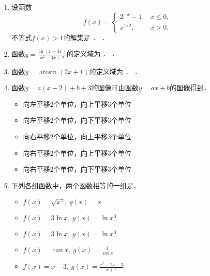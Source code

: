 \begin{enumerate}
\item 设函数
  \[
    f(x) =
    \begin{cases}
      2^{-x} - 1, & x \le 0, \\
      x^{1/2}, & x > 0.
    \end{cases}
  \]
  不等式\(f(x) > 1\)的解集是
  \ifshowsol
    \uline{}．
  \else
    \uline{\makebox[10em]{}}．
  \fi

\item 函数\(\displaystyle y = \frac{\ln(1+3x)}{x^2-3x+2}\)的定义域为
  \ifshowsol
    \uline{}．
  \else
    \uline{\makebox[13em]{}}．
  \fi

\item 函数\(y = \arcsin(2x+1)\)的定义域为
  \ifshowsol
    \uline{}．
  \else
    \uline{\makebox[5em]{}}．
  \fi

\item 函数\(y = a(x-2) + b + 3\)的图像可由函数\(y = ax + b\)的图像\uline{\makebox[4em]{}}得到．
  \begin{itemize}
    \renewcommand{\labelitemi}{\faCircleThin}
  \item 向左平移\(2\)个单位，向上平移\(3\)个单位
  \item 向左平移\(2\)个单位，向下平移\(3\)个单位
    \ifshowsol
    \item[\faCircle] 向右平移\(2\)个单位，向上平移\(3\)个单位
    \else
    \item 向右平移\(2\)个单位，向上平移\(3\)个单位
    \fi
  \item 向右平移\(2\)个单位，向下平移\(3\)个单位
  \end{itemize}

\item 下列各组函数中，两个函数相等的一组是\uline{\makebox[4em]{}}．
  \begin{itemize}
    \renewcommand{\labelitemi}{\faCircleThin}
  \item \(f(x) = \sqrt{x^2},\ g(x) = x\)
    \ifshowsol
    \item[\faCircle] \(f(x) = 3\ln x,\ g(x) = \ln x^3\)
    \else
    \item \(f(x) = 3\ln x,\ g(x) = \ln x^3\)
    \fi
  \item \(f(x) = \tan x,\ g(x) = \frac1{\cot x}\)
  \item \(f(x) = x - 3,\ g(x) = \frac{x^2-2x-3}{x+1}\)
  \end{itemize}
\end{enumerate}
\fi

